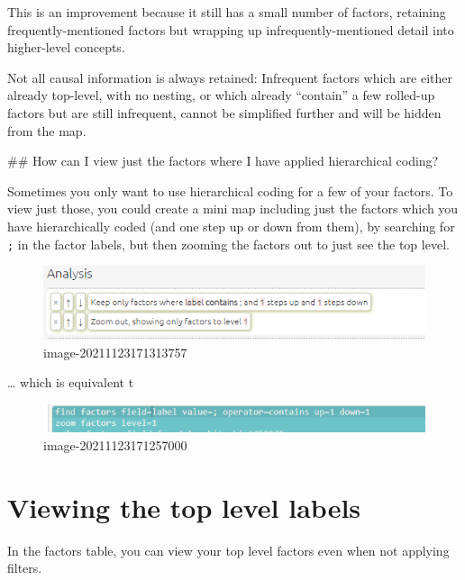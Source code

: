 \documentclass[
]{book}
\begin{document}
This is an improvement because it still has a small number of factors, retaining frequently-mentioned factors but wrapping up infrequently-mentioned detail into higher-level concepts.

Not all causal information is always retained: Infrequent factors which are either already top-level, with no nesting, or which already ``contain'' a few rolled-up factors but are still infrequent, cannot be simplified further and will be hidden from the map.

\#\# How can I view just the factors where I have applied hierarchical coding?

Sometimes you only want to use hierarchical coding for a few of your factors. To view just those, you could create a mini map including just the factors which you have hierarchically coded (and one step up or down from them), by searching for \texttt{;} in the factor labels, but then zooming the factors out to just see the top level.

\begin{figure}
\centering
\includegraphics{_assets/image-20211123171313757.png}
\caption{image-20211123171313757}
\end{figure}

\ldots{} which is equivalent t

\begin{figure}
\centering
\includegraphics{_assets/image-20211123171257000.png}
\caption{image-20211123171257000}
\end{figure}

\hypertarget{viewing-the-top-level-labels}{%
\section{Viewing the top level labels}\label{viewing-the-top-level-labels}}

In the factors table, you can view your top level factors even when not applying filters.
\end{document}
